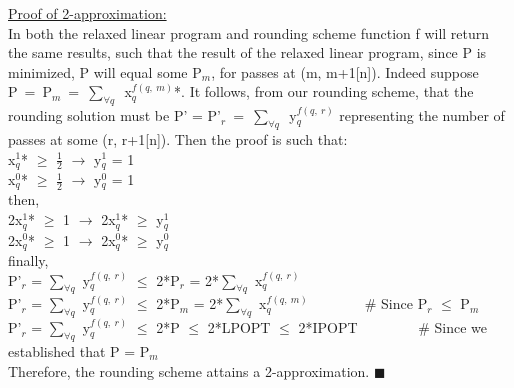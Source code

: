 \documentclass[10pt]{csc_assignment}
\begin{document}
\begin{description}
\begin{flushleft}
\underline{Proof of 2-approximation:}\\
In both the relaxed linear program and rounding scheme function f will return the same results, such that the result of the relaxed linear program, since P is minimized, P will equal some P$_{m}$, for passes at (m, m+1[n]). Indeed suppose \mbox{P = P$_{m}$ = $\sum_{\forall q}$ x$_{q}^{f(q,~ m)}$}*. It follows, from our rounding scheme, that the rounding solution must be P' = \mbox{P'$_{r}$ = $\sum_{\forall q}$ y$_{q}^{f(q,~ r)}$} representing the number of passes at some (r, r+1[n]). Then the proof is such that:\\
x$_{q}^1$* $\geqslant$ $\frac{1}{2}$ $\rightarrow$ y$_{q}^1$ = 1\\
x$_{q}^0$* $\geqslant$ $\frac{1}{2}$ $\rightarrow$ y$_{q}^0$ = 1\\
then,\\
2x$_{q}^1$* $\geqslant$ 1 $\rightarrow$ 2x$_{q}^1$* $\geqslant$ y$_{q}^1$\\
2x$_{q}^0$* $\geqslant$ 1 $\rightarrow$ 2x$_{q}^0$* $\geqslant$ y$_{q}^0$\\
finally,\\
P'$_{r}$ = $\sum_{\forall q}$ y$_{q}^{f(q,~ r)}$ $\leqslant$
2*P$_{r}$ = 2*$\sum_{\forall q}$ x$_{q}^{f(q,~ r)}$\\ 
P'$_{r}$ = $\sum_{\forall q}$ y$_{q}^{f(q,~ r)}$
$\leqslant$
2*P$_{m}$ = 2*$\sum_{\forall q}$ x$_{q}^{f(q,~ m)}$~~~~~~~~\# Since P$_{r}$ $\leqslant$ P$_{m}$\\
P'$_{r}$ = $\sum_{\forall q}$ y$_{q}^{f(q,~ r)}$ $\leqslant$ 2*P $\leqslant$  2*LPOPT $\leqslant$ 2*IPOPT ~~~~~~~~\# Since we established that P = P$_{m}$\\
Therefore, the rounding scheme attains a 2-approximation. $\blacksquare$\\
 


\end{flushleft}
\end{description}
\end{document}
